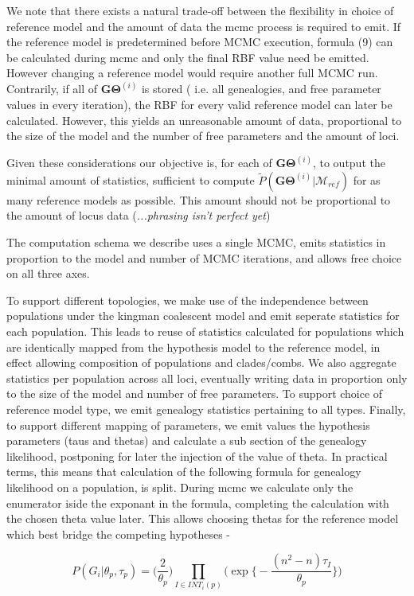 \documentclass[11pt]{article}
\newcommand{\vect}[1]{\boldsymbol{\mathbf{#1}}}
\newcommand{\M}{\mathcal{M}}
\newcommand{\G}{\vect{G}}
\newcommand{\T}{\vect{\Theta}}
\newcommand{\GT}{\G\T}
\newcommand{\Mref}{\M_{ref}}
\newcommand{\Pref}{\widetilde{P}}
\begin{document}
\begin{itemize}
We note that there exists a natural trade-off between the flexibility in choice of reference model and the amount of data the mcmc process is required to emit. If the reference model is predetermined before MCMC execution, formula (9) can be calculated during mcmc and only the final RBF value need be emitted. However changing a reference model would require another full MCMC run.
Contrarily, if all of $\GT^{(i)}$ is stored ( i.e. all genealogies, and free parameter values in every iteration), the RBF for every valid reference model can later be calculated. However, this yields an unreasonable amount of data, proportional to the size of the model and the number of free parameters and the amount of loci.

Given these considerations our objective is, for each of $\GT^{(i)}$, to output the minimal amount of statistics, sufficient to compute $\Pref(\GT^{(i)}|\Mref)$ for as many reference models as possible. This amount should not be proportional to the amount of locus data (\textit{...phrasing isn't perfect yet})

The computation schema we describe uses a single MCMC, emits statistics in proportion to the model and number of MCMC iterations, and allows free choice on all three axes. 

To support different topologies, we make use of the independence between populations under the kingman coalescent model and emit seperate statistics for each population. This leads to reuse of statistics calculated for populations which are identically mapped from the hypothesis model to the reference model, in effect allowing composition of populations and clades/combs.  We also aggregate statistics per population across all loci, eventually  writing data in proportion only to the size of the model and number of free parameters. To support choice of reference model type, we emit genealogy statistics pertaining to all types. Finally, to support different mapping of parameters, we emit values the hypothesis parameters (taus and thetas) and calculate a sub section of the genealogy likelihood, postponing for later the injection of the value of theta. In practical terms, this means that calculation of the following formula for genealogy likelihood on a population, is split. During mcmc we calculate only the enumerator iside the exponant in the formula, completing the calculation with the chosen theta value later. This allows choosing thetas for the reference model which best bridge the competing hypotheses - 

\begin{equation}
P(G_i|\theta_p, \tau_p)
  = \Big( \frac{2}{\theta_p} \Big)  \prod_{I\in INT_i(p)} \bigg(  \exp \Big\{ -  \frac{(n^2-n)\tau_I}{\theta_p}   \Big\}  \bigg)
\end{equation}


\end{itemize}
\end{document}
